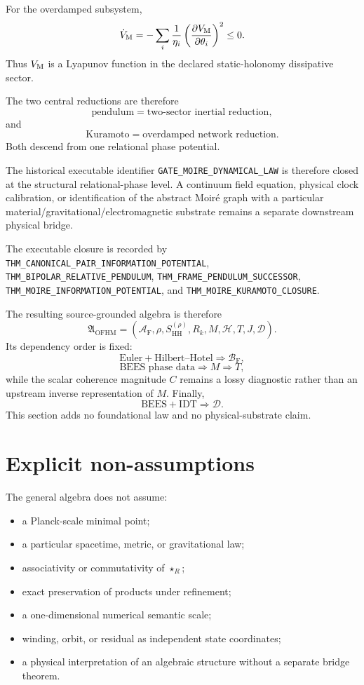 \documentclass[11pt]{article}
\newcommand{\claimid}[1]{\nolinkurl{#1}}
\begin{document}
For the overdamped subsystem,
\[
\dot V_{\rm M}
=
-\sum_i
\frac1{\eta_i}
\left(
\frac{\partial V_{\rm M}}{\partial\theta_i}
\right)^2
\le0.
\]
Thus \(V_{\rm M}\) is a Lyapunov function in the declared static-holonomy
dissipative sector.

The two central reductions are therefore
\[
\boxed{
\text{pendulum}
=
\text{two-sector inertial reduction},
}
\]
and
\[
\boxed{
\text{Kuramoto}
=
\text{overdamped network reduction}.
}
\]
Both descend from one relational phase potential.

The historical executable identifier
\claimid{GATE_MOIRE_DYNAMICAL_LAW}
is therefore closed at the structural relational-phase level. A continuum
field equation, physical clock calibration, or identification of the abstract
Moir\'e graph with a particular material/gravitational/electromagnetic
substrate remains a separate downstream physical bridge.

The executable closure is recorded by
\claimid{THM_CANONICAL_PAIR_INFORMATION_POTENTIAL},
\claimid{THM_BIPOLAR_RELATIVE_PENDULUM},
\claimid{THM_FRAME_PENDULUM_SUCCESSOR},
\claimid{THM_MOIRE_INFORMATION_POTENTIAL}, and
\claimid{THM_MOIRE_KURAMOTO_CLOSURE}.

The resulting source-grounded algebra is therefore
\[
\boxed{
\mathfrak A_{\mathrm{OFHM}}
=
(
\mathcal A_{\mathrm F},
\rho,
S_{\mathrm{HH}}^{(\rho)},
R_k,
M,
\mathcal H,
T,
J,
\mathcal D
).
}
\]
Its dependency order is fixed:
\[
\boxed{
\text{Euler}
+
\text{Hilbert--Hotel}
\Rightarrow
\mathcal B_{\mathrm F},
}
\]
\[
\boxed{
\text{BEES phase data}
\Rightarrow
M
\Rightarrow
T,
}
\]
while the scalar coherence magnitude \(C\) remains a lossy diagnostic rather
than an upstream inverse representation of \(M\). Finally,
\[
\boxed{
\text{BEES}
+
\text{IDT}
\Rightarrow
\mathcal D.
}
\]
This section adds no foundational law and no physical-substrate claim.

\section{Explicit non-assumptions}

The general algebra does not assume:
\begin{itemize}
  \item a Planck-scale minimal point;
  \item a particular spacetime, metric, or gravitational law;
  \item associativity or commutativity of \(\star_R\);
  \item exact preservation of products under refinement;
  \item a one-dimensional numerical semantic scale;
  \item winding, orbit, or residual as independent state coordinates;
  \item a physical interpretation of an algebraic structure without a
        separate bridge theorem.
\end{itemize}
\end{document}
